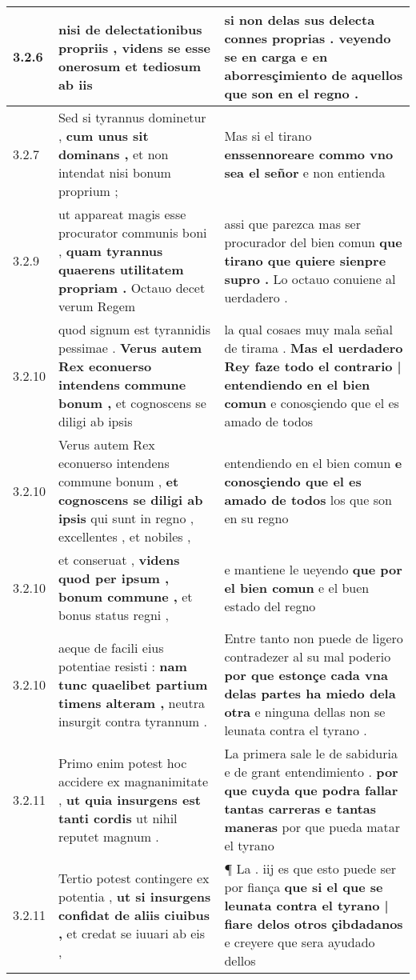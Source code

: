 \begin{tabular}{|p{1cm}|p{6.5cm}|p{6.5cm}|}
3.2.6 & nisi de delectationibus propriis , \textbf{ videns se esse onerosum et tediosum } ab iis & si non delas sus delecta connes proprias . \textbf{ veyendo se en carga e en aborresçimiento } de aquellos que son en el regno . \\\hline
3.2.7 & Sed si tyrannus dominetur , \textbf{ cum unus sit dominans , } et non intendat nisi bonum proprium ; & Mas si el tirano \textbf{ enssennoreare commo vno sea el señor } e non entienda \\\hline
3.2.9 & ut appareat magis esse procurator communis boni , \textbf{ quam tyrannus quaerens utilitatem propriam . } Octauo decet verum Regem & assi que parezca mas ser procurador del bien comun \textbf{ que tirano que quiere sienpre supro . } Lo octauo conuiene al uerdadero . \\\hline
3.2.10 & quod signum est tyrannidis pessimae . \textbf{ Verus autem Rex econuerso intendens commune bonum , } et cognoscens se diligi ab ipsis & la qual cosaes muy mala señal de tirama . \textbf{ Mas el uerdadero Rey faze todo el contrario | entendiendo en el bien comun } e conosçiendo que el es amado de todos \\\hline
3.2.10 & Verus autem Rex econuerso intendens commune bonum , \textbf{ et cognoscens se diligi ab ipsis } qui sunt in regno , excellentes , et nobiles , & entendiendo en el bien comun \textbf{ e conosçiendo que el es amado de todos } los que son en su regno \\\hline
3.2.10 & et conseruat , \textbf{ videns quod per ipsum , bonum commune , } et bonus status regni , & e mantiene le ueyendo \textbf{ que por el bien comun } e el buen estado del regno \\\hline
3.2.10 & aeque de facili eius potentiae resisti : \textbf{ nam tunc quaelibet partium timens alteram , } neutra insurgit contra tyrannum . & Entre tanto non puede de ligero contradezer al su mal poderio \textbf{ por que estonçe cada vna delas partes ha miedo dela otra } e ninguna dellas non se leunata contra el tyrano . \\\hline
3.2.11 & Primo enim potest hoc accidere ex magnanimitate , \textbf{ ut quia insurgens est tanti cordis } ut nihil reputet magnum . & La primera sale le de sabiduria e de grant entendimiento . \textbf{ por que cuyda que podra fallar tantas carreras e tantas maneras } por que pueda matar el tyrano \\\hline
3.2.11 & Tertio potest contingere ex potentia , \textbf{ ut si insurgens confidat de aliis ciuibus , } et credat se iuuari ab eis , & ¶ La . iij es que esto puede ser por fiança \textbf{ que si el que se leunata contra el tyrano | fiare delos otros çibdadanos } e creyere que sera ayudado dellos \\\hline

\end{tabular}
